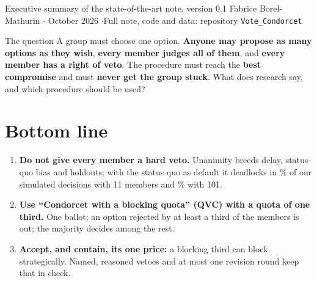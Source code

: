 \documentclass[10pt,a4paper]{article}
\begin{document}
{Executive summary of the state-of-the-art note, version 0.1}
{Fabrice Borel-Mathurin \quad$\cdot$ October 2026 \quad$\cdot$\quad Full note, code and data:
repository \texttt{Vote\_Condorcet}}

\begin{keybox}{The question}
A group must choose one option. \textbf{Anyone may propose as many options as they wish}, \textbf{every
member judges all of them}, and \textbf{every member has a right of veto}. The procedure must reach the
\textbf{best compromise} and must \textbf{never get the group stuck}. What does research say, and which
procedure should be used?
\end{keybox}

\section{Bottom line}
\begin{enumerate}[label=\textbf{\arabic*.}]
  \item \textbf{Do not give every member a hard veto.} Unanimity breeds delay, status-quo bias and
  holdouts; with the status quo as default it deadlocks in \KNdeadlockUnanimityEleven\% of our simulated
  decisions with 11 members and \KNdeadlockUnanimity\% with 101.
  \item \textbf{Use ``Condorcet with a blocking quota'' (QVC) with a quota of one third.} One ballot; an
  option rejected by at least a third of the members is out; the majority decides among the rest.
  \item \textbf{Accept, and contain, its one price:} a blocking third can block strategically.
  Named, reasoned vetoes and at most one revision round keep that in check.
\end{enumerate}
\end{document}
